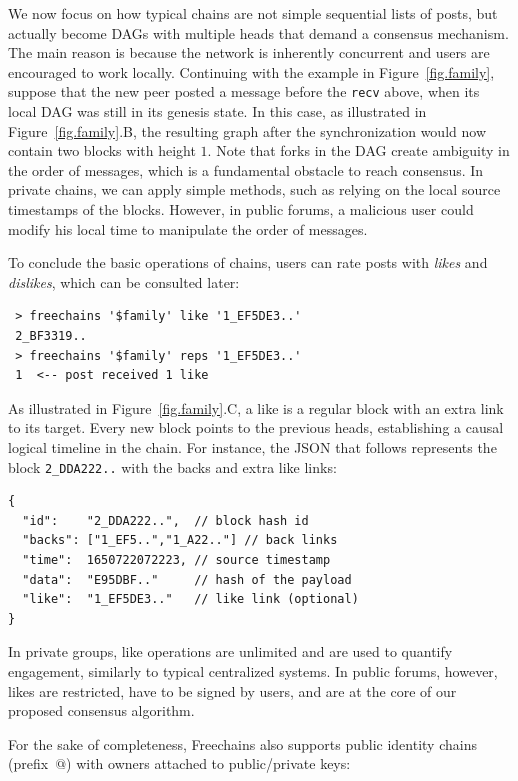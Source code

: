 \documentclass[10pt,journal,compsoc]{IEEEtran}
\newcommand{\FC}       {Freechains\xspace}
\newcommand{\code}[1]  {\texttt{\footnotesize{#1}}}
\begin{document}
We now focus on how typical chains are not simple sequential lists of posts,
but actually become DAGs with multiple heads that demand a consensus
mechanism.
The main reason is because the network is inherently concurrent and users are
encouraged to work locally.
Continuing with the example in Figure~\ref{fig.family}, suppose that the new
peer posted a message before the \code{recv} above, when its local DAG was
still in its genesis state.
In this case, as illustrated in Figure~\ref{fig.family}.B, the resulting graph
after the synchronization would now contain two blocks with height $1$.
%
Note that forks in the DAG create ambiguity in the order of messages, which is
a fundamental obstacle to reach consensus.
In private chains, we can apply simple methods, such as relying on the local
source timestamps of the blocks.
However, in public forums, a malicious user could modify his local time to
manipulate the order of messages.

To conclude the basic operations of chains, users can rate posts with
\emph{likes} and \emph{dislikes}, which can be consulted later:

{\footnotesize
\begin{verbatim}
 > freechains '$family' like '1_EF5DE3..'
 2_BF3319..
 > freechains '$family' reps '1_EF5DE3..'
 1  <-- post received 1 like
\end{verbatim}
}

As illustrated in Figure~\ref{fig.family}.C, a like is a regular block with an
extra link to its target.
Every new block points to the previous heads, establishing a causal logical
timeline in the chain.
For instance, the JSON that follows represents the block \code{2\_DDA222..}
with the backs and extra like links:

{\footnotesize
\begin{verbatim}
{
  "id":    "2_DDA222..",  // block hash id
  "backs": ["1_EF5..","1_A22.."] // back links
  "time":  1650722072223, // source timestamp
  "data":  "E95DBF.."     // hash of the payload
  "like":  "1_EF5DE3.."   // like link (optional)
}
\end{verbatim}
}

In private groups, like operations are unlimited and are used to quantify
engagement, similarly to typical centralized systems.
In public forums, however, likes are restricted, have to be signed by users,
and are at the core of our proposed consensus algorithm.

For the sake of completeness, \FC also supports public identity chains
(prefix~$@$) with owners attached to public/private keys:
\end{document}
